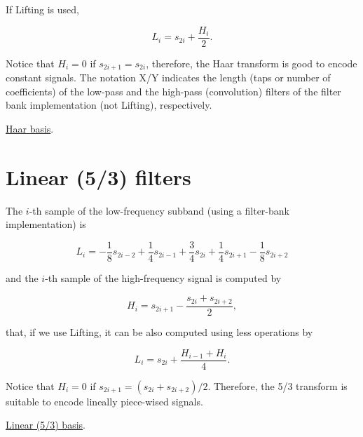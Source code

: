 If Lifting is used,

\begin{equation}
  L_i=s_{2i}+\frac{H_i}{2}.
  \tag{HaarLLifted}
  \label{eq:Haar_A-LPF-lifting}
\end{equation}

Notice that \(H_i=0\) if \(s_{2i+1}=s_{2i}\), therefore, the Haar
transform is good to encode constant signals. The notation X/Y indicates
the length (taps or number of coefficients) of the low-pass and the
high-pass (convolution) filters of the filter bank implementation (not
Lifting), respectively.

\href{https://nbviewer.jupyter.org/github/vicente-gonzalez-ruiz/image_transformations_for_coding/blob/master/Haar_2d_basis.ipynb}{Haar basis}.

\section{Linear (5/3) filters~\cite{sweldens1997building}}
The $i$-th sample of the low-frequency subband (using a filter-bank implementation) is

\begin{equation}
  L_i=-\frac{1}{8}s_{2i-2}+\frac{1}{4}s_{2i-1}+\frac{3}{4}s_{2i}
  +\frac{1}{4}s_{2i+1}-\frac{1}{8}s_{2i+2}
  \tag{5/3L}
  \label{eq:Lineal_A-LPF}
\end{equation}

and the $i$-th sample of the high-frequency signal is computed by

\begin{equation}
  H_i=s_{2i+1}-\frac{s_{2i}+s_{2i+2}}{2},
  \tag{5/3H}
  \label{eq:Lineal_A-HPF}
\end{equation}

that, if we use Lifting, it can be also computed using less operations by

\begin{equation}
  L_i=s_{2i}+\frac{H_{i-1}+H_i}{4}.
  \tag{5/3LLifted}
  \label{eq:Lineal_A-LPF_lifting}
\end{equation}

Notice that $H_i=0$ if $s_{2i+1}=(s_{2i}+s_{2i+2})/2$. Therefore, the 5/3 transform is suitable to encode lineally piece-wised signals.

\href{https://nbviewer.jupyter.org/github/vicente-gonzalez-ruiz/image_transformations_for_coding/blob/master/linear_2d_basis.ipynb}{Linear (5/3) basis}.


